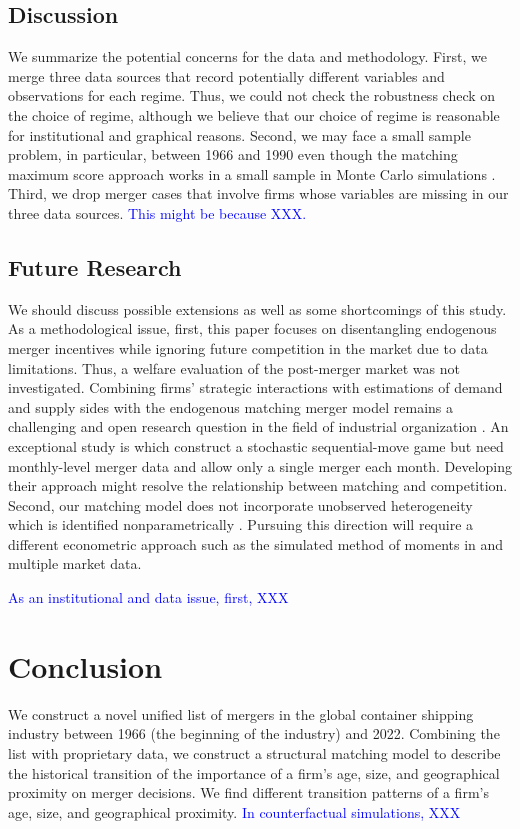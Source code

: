 \documentclass[10pt]{article}
\begin{document}
\subsection{Discussion}
We summarize the potential concerns for the data and methodology. 
First, we merge three data sources that record potentially different variables and observations for each regime. 
Thus, we could not check the robustness check on the choice of regime, although we believe that our choice of regime is reasonable for institutional and graphical reasons.
Second, we may face a small sample problem, in particular, between 1966 and 1990 even though the matching maximum score approach works in a small sample in Monte Carlo simulations \citep{akkus2015ms,otani2021matching_cost}.
Third, we drop merger cases that involve firms whose variables are missing in our three data sources. 
\textcolor{blue}{This might be because XXX.}


\subsection{Future Research}

We should discuss possible extensions as well as some shortcomings of this study. 
As a methodological issue, first, this paper focuses on disentangling endogenous merger incentives while ignoring future competition in the market due to data limitations. 
Thus, a welfare evaluation of the post-merger market was not investigated.
Combining firms' strategic interactions with estimations of demand and supply sides with the endogenous matching merger model remains a challenging and open research question in the field of industrial organization \citep{agarwal2021market}. 
An exceptional study is \cite{igami2019mergers} which construct a stochastic sequential-move game but need monthly-level merger data and allow only a single merger each month. 
Developing their approach might resolve the relationship between matching and competition.
Second, our matching model does not incorporate unobserved heterogeneity which is identified nonparametrically \citep{fox2018jpe}.
Pursuing this direction will require a different econometric approach such as the simulated method of moments in \cite{fox2018jpe} and multiple market data. 

\textcolor{blue}{As an institutional and data issue, first, XXX}



\section{Conclusion}\label{sec:conclusion}
We construct a novel unified list of mergers in the global container shipping industry between 1966 (the beginning of the industry) and 2022. 
Combining the list with proprietary data, we construct a structural matching model \citep{fox2018qe} to describe the historical transition of the importance of a firm's age, size, and geographical proximity on merger decisions. 
We find different transition patterns of a firm's age, size, and geographical proximity.
\textcolor{blue}{In counterfactual simulations, XXX}



\end{document}
